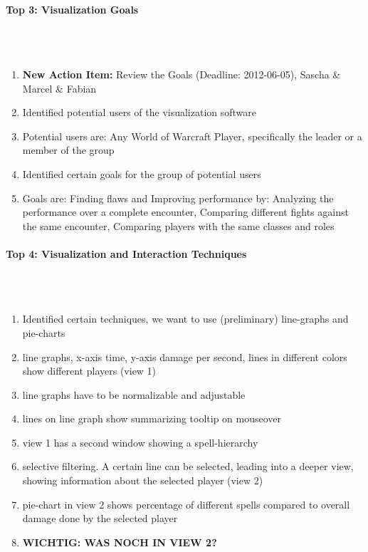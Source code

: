 \documentclass{scrartcl}
\begin{document}
\paragraph{Top 3: Visualization Goals}
\hfill \\ \hfill \\
\begin {enumerate}
\item \textbf{New Action Item:} Review the Goals (Deadline: 2012-06-05), Sascha \& Marcel \& Fabian
\item Identified potential users of the visualization software
\item Potential users are: Any World of Warcraft Player, specifically the leader or a member of the group
\item Identified certain goals for the group of potential users 
\item Goals are: Finding flaws and Improving performance by: Analyzing the performance over a complete encounter, Comparing different fights against the same encounter, Comparing players with the same classes and roles
\end {enumerate}

\paragraph{Top 4: Visualization and Interaction Techniques}
\hfill \\ \hfill \\
\begin {enumerate}
\item Identified certain techniques, we want to use (preliminary) line-graphs and pie-charts
\item line graphs, x-axis time, y-axis damage per second, lines in different colors show different players (view 1)
\item line graphs have to be normalizable and adjustable
\item lines on line graph show summarizing tooltip on mouseover
\item view 1 has a second window showing a spell-hierarchy 
\item selective filtering. A certain line can be selected, leading into a deeper view, showing information about the selected player (view 2)
\item pie-chart in view 2 shows percentage of different spells compared to overall damage done by the selected player
\item \textbf{WICHTIG: WAS NOCH IN VIEW 2?}
\end {enumerate}
\end{document}
